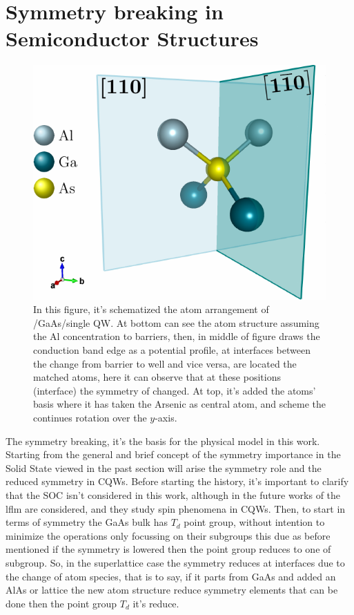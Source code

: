 \section{Symmetry breaking in Semiconductor Structures}
\label{subsec:chapter-2-symmetry-breaking}
\vspace{-10mm}
\begin{figure}[H]
	\centering
		\includegraphics[width=\linewidth]{../figures/chapter-2/symmetry/out-ruco/sym-1}
	\caption{In this figure, it's schematized the atom arrangement of \algaas/GaAs/\algaas single QW. At bottom can see the atom structure assuming the Al concentration to barriers, then, in middle of figure draws the conduction band edge as a potential profile, at interfaces between the change from barrier to well and vice versa,  are located the matched atoms, here it can observe that at these positions (interface) the symmetry of changed.  At top, it's added the atoms' basis where it has taken the Arsenic as central atom, and scheme the continues rotation over the $y$-axis. }
	\label{fig:subsubsection-2.2-qws-symmetry}
\end{figure}
The symmetry breaking, it's the basis for the physical model in this work. Starting from the general and brief concept of the symmetry importance in the Solid State viewed in the past section will arise the symmetry role and the reduced symmetry in CQWs. Before starting the history, it's important to clarify that the SOC isn't considered in this work, although in the future works of the \gls{lflm} are considered, and they study spin phenomena in CQWs. Then, to start in terms of symmetry the GaAs bulk has $T_{d}$ point group, without intention to minimize the operations only focussing on their subgroups this due as before mentioned if the symmetry is lowered then the point group reduces to one of subgroup\cite{dresselhaus2007group}. So, in the superlattice case the symmetry reduces at interfaces due to the change of atom species, that is to say, if it parts from GaAs and added an AlAs or \algaas lattice the new atom structure reduce symmetry elements that can be done then the point group $T_{d}$ it's reduce. 
